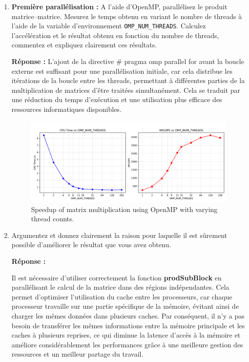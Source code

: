 \documentclass[11pt,a4paper]{article}
\begin{document}
\begin{enumerate}
	\item \textbf{\color{blue}Première parallélisation :} A l'aide d'OpenMP, parallélisez le produit matrice--matrice. Mesurez le temps obtenu en variant le nombre de threads à l'aide de la variable d'environnement \texttt{OMP\_NUM\_THREADS}. Calculez l'accélération et le résultat obtenu en fonction du nombre de threads, commentez et expliquez clairement ces résultats. 
	
	\textbf{Réponse :} L'ajout de la directive \# pragma omp parallel for avant la boucle externe est suffisant pour une parallélisation initiale, car cela distribue les itérations de la boucle entre les threads, permettant à différentes parties de la multiplication de matrices d'être traitées simultanément. Cela se traduit par une réduction du temps d'exécution et une utilisation plus efficace des ressources informatiques disponibles.

	\begin{figure}[H]
		\centering
		\includegraphics[width=\textwidth]{parallel1.pdf}
		\caption{Speedup of matrix multiplication using OpenMP with varying thread counts.}
	\end{figure}

	\item Argumentez et donnez clairement la raison pour laquelle il est sûrement possible d'améliorer le résultat que vous avez obtenu.
	
	\textbf{Réponse :} 
	
	Il est nécessaire d'utiliser correctement la fonction \textbf{prodSubBlock} en parallélisant le calcul de la matrice dans des régions indépendantes. Cela permet d'optimiser l'utilisation du cache entre les processeurs, car chaque processeur travaille sur une partie spécifique de la mémoire, évitant ainsi de charger les mêmes données dans plusieurs caches. Par conséquent, il n'y a pas besoin de transférer les mêmes informations entre la mémoire principale et les caches à plusieurs reprises, ce qui diminue la latence d'accès à la mémoire et améliore considérablement les performances grâce à une meilleure gestion des ressources et un meilleur partage du travail.


\end{enumerate}
\end{document}
